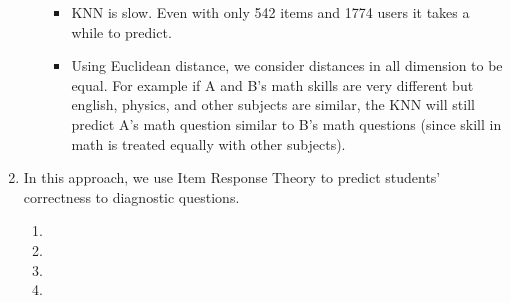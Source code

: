 \documentclass{article}
\begin{document}
\begin{enumerate}[label=\arabic*.]
\begin{enumerate}[label=(\alph*)]
                \begin{itemize}
                    \item KNN is slow. Even with only 542 items and 1774 users it takes a while to predict.
                    \item Using Euclidean distance, we consider distances in all dimension to be equal. For example if A and B's math skills are very different but english, physics, and other subjects are similar, the KNN will still predict A's math question similar to B's math questions (since skill in math is treated equally with other subjects).
                \end{itemize}

        \end{enumerate}
        
    \item In this approach, we use Item Response Theory to predict students' correctness to diagnostic questions.
        \begin{enumerate}[label=(\alph*)]
            \item 
            \item 
            \item 
            \item 
        \end{enumerate}
        

\end{enumerate}
\end{document}
